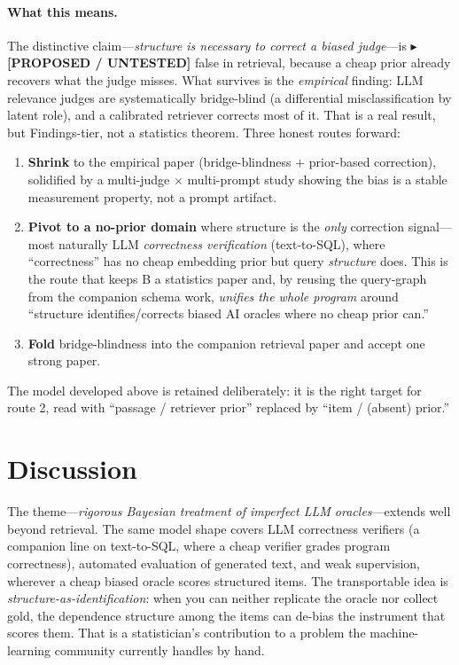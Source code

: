 \documentclass[11pt]{article}
\newcommand{\PROP}[1]{{\color{violet}\small$\blacktriangleright$\,\textbf{[PROPOSED / UNTESTED]} #1}}
\begin{document}
\paragraph{What this means.} The distinctive claim---\emph{structure is necessary to correct a biased judge}---is
\PROP{false in retrieval, because a cheap prior already recovers what the judge misses.} What survives is the
\emph{empirical} finding: LLM relevance judges are systematically bridge-blind (a differential misclassification
by latent role), and a calibrated retriever corrects most of it. That is a real result, but Findings-tier, not a
statistics theorem. Three honest routes forward:
\begin{enumerate}[leftmargin=*,itemsep=1pt]
  \item \textbf{Shrink} to the empirical paper (bridge-blindness $+$ prior-based correction), solidified by a
  multi-judge $\times$ multi-prompt study showing the bias is a stable measurement property, not a prompt artifact.
  \item \textbf{Pivot to a no-prior domain} where structure is the \emph{only} correction signal---most naturally
  LLM \emph{correctness verification} (text-to-SQL), where ``correctness'' has no cheap embedding prior but query
  \emph{structure} does. This is the route that keeps B a statistics paper and, by reusing the query-graph from
  the companion schema work, \emph{unifies the whole program} around ``structure identifies/corrects biased AI
  oracles where no cheap prior can.''
  \item \textbf{Fold} bridge-blindness into the companion retrieval paper and accept one strong paper.
\end{enumerate}
The model developed above is retained deliberately: it is the right target for route 2, read with ``passage /
retriever prior'' replaced by ``item / (absent) prior.''

\section{Discussion}
The theme---\emph{rigorous Bayesian treatment of imperfect LLM oracles}---extends well beyond retrieval. The
same model shape covers LLM correctness verifiers (a companion line on text-to-SQL, where a cheap verifier
grades program correctness), automated evaluation of generated text, and weak supervision, wherever a cheap
biased oracle scores structured items. The transportable idea is \emph{structure-as-identification}: when you
can neither replicate the oracle nor collect gold, the dependence structure among the items can de-bias the
instrument that scores them. That is a statistician's contribution to a problem the machine-learning community
currently handles by hand.
\end{document}
